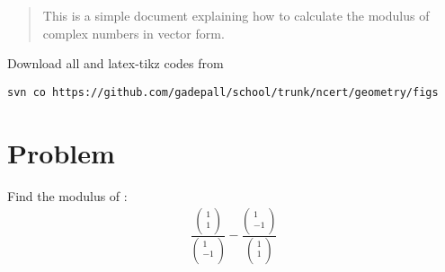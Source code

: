 \documentclass[journal,12pt,twocolumn]{IEEEtran}
\begin{document}
%

\begin{abstract}
This is a simple document explaining how to calculate the modulus of complex numbers in vector form.
\end{abstract}

%

Download all and latex-tikz codes from 
%
\begin{lstlisting}
svn co https://github.com/gadepall/school/trunk/ncert/geometry/figs
\end{lstlisting}
%


\section{Problem}
%
Find the modulus of :
\begin{align}
\frac{\begin{pmatrix}
      1 \\ 
      1 \\
      \end{pmatrix}}{\begin{pmatrix}
      1 \\ 
      -1 \\
      \end{pmatrix}} - \frac{\begin{pmatrix}
      1 \\ 
      -1 \\
      \end{pmatrix}}{\begin{pmatrix}
      1 \\ 
      1 \\
      \end{pmatrix}}
\end{align}

\end{document}
